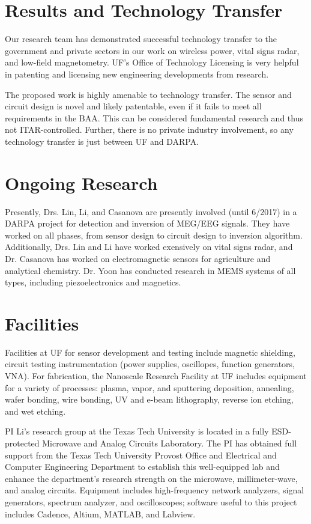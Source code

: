 \section{Results and Technology Transfer}

Our research team has demonstrated successful technology transfer to the government and private sectors in our work on wireless power, vital signs radar, and low-field magnetometry. UF's Office of Technology Licensing is very helpful in patenting and licensing new engineering developments from research.

The proposed work is highly amenable to technology transfer. The sensor and circuit design is novel and likely patentable, even if it fails to meet all requirements in the BAA. This can be considered fundamental research and thus not ITAR-controlled. Further, there is no private industry involvement, so any technology transfer is just between UF and DARPA.

\section{Ongoing Research}
Presently, Drs. Lin, Li, and Casanova are presently involved (until 6/2017) in a DARPA project for detection and inversion of MEG/EEG signals. They have worked on all phases, from sensor design to circuit design to inversion algorithm. Additionally, Drs. Lin and Li have worked exensively on vital signs radar, and Dr. Casanova has worked on electromagnetic sensors for agriculture and analytical chemistry. Dr. Yoon has conducted research in MEMS systems of all types, including piezoelectronics and magnetics. 

\section{Facilities}

Facilities at UF for sensor development and testing include magnetic shielding, circuit testing instrumentation (power supplies, oscillopes, function generators, VNA). For fabrication, the Nanoscale Research Facility at UF includes equipment for a variety of processes: plasma, vapor, and sputtering deposition, annealing, wafer bonding, wire bonding, UV and e-beam lithography, reverse ion etching, and wet etching.

PI Li’s research group at the Texas Tech University is located in a fully ESD-protected Microwave and Analog Circuits Laboratory. The PI has obtained full support from the Texas Tech University Provost Office and Electrical and Computer Engineering Department to establish this well-equipped lab and enhance the department’s research strength on the microwave, millimeter-wave, and analog circuits. Equipment includes high-frequency network analyzers, signal generators, spectrum analyzer, and oscilloscopes; software useful to this project includes Cadence, Altium, MATLAB, and Labview.

